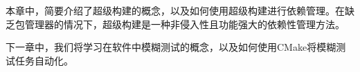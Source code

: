 本章中，简要介绍了超级构建的概念，以及如何使用超级构建进行依赖管理。在缺乏包管理器的情况下，超级构建是一种非侵入性且功能强大的依赖性管理方法。

下一章中，我们将学习在软件中模糊测试的概念，以及如何使用CMake将模糊测试任务自动化。